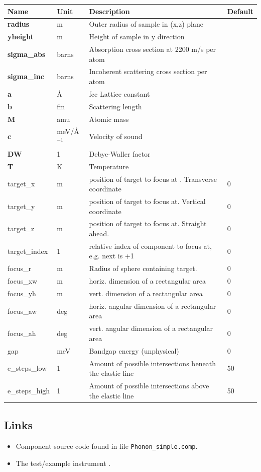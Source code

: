 \begin{longtable}{p{}p{}p{}p{}}
\toprule
\textbf{Name} & \textbf{Unit} & \textbf{Description} & \textbf{Default} \\
\midrule
\endhead
\textbf{radius} & m & Outer radius of sample in (x,z) plane &  \\
\textbf{yheight} & m & Height of sample in y direction &  \\
\textbf{sigma\_abs} & barns & Absorption cross section at 2200 m/s per atom &  \\
\textbf{sigma\_inc} & barns & Incoherent scattering cross section per atom &  \\
\textbf{a} & \AA{} & fcc Lattice constant &  \\
\textbf{b} & fm & Scattering length &  \\
\textbf{M} & amu & Atomic mass &  \\
\textbf{c} & meV/\AA{}$^{-1}$ & Velocity of sound &  \\
\textbf{DW} & 1 & Debye-Waller factor &  \\
\textbf{T} & K & Temperature &  \\
target\_x & m & position of target to focus at . Transverse coordinate & 0 \\
target\_y & m & position of target to focus at. Vertical coordinate & 0 \\
target\_z & m & position of target to focus at. Straight ahead. & 0 \\
target\_index & 1 & relative index of component to focus at, e.g. next is +1 & 0 \\
focus\_r & m & Radius of sphere containing target. & 0 \\
focus\_xw & m & horiz. dimension of a rectangular area & 0 \\
focus\_yh & m & vert.  dimension of a rectangular area & 0 \\
focus\_aw & deg & horiz. angular dimension of a rectangular area & 0 \\
focus\_ah & deg & vert.  angular dimension of a rectangular area & 0 \\
gap & meV & Bandgap energy (unphysical) & 0 \\
e\_steps\_low & 1 & Amount of possible intersections beneath the elastic line & 50 \\
e\_steps\_high & 1 & Amount of possible intersections above the elastic line & 50 \\
\bottomrule
\end{longtable}

\subsection*{Links}
\begin{itemize}
  \item Component source code found in file \texttt{Phonon\_simple.comp}.
  \item The test/example instrument .
\end{itemize}

